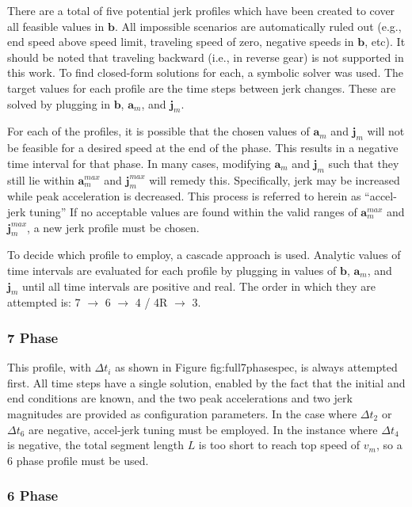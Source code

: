 \documentclass[letterpaper, 10 pt, conference]{ieeeconf}  %
\begin{document}
There are a total of five potential jerk profiles which have been created to cover all feasible values in $\mathbf{b}$.
All impossible scenarios are automatically ruled out (e.g., end speed above speed limit, traveling speed of zero, negative speeds in $\mathbf{b}$, etc).
It should be noted that traveling backward (i.e., in reverse gear) is not supported in this work.
To find closed-form solutions for each, a symbolic solver was used.
The target values for each profile are the time steps between jerk changes.
These are solved by plugging in $\mathbf{b}$, $\mathbf{a}_m$, and $\mathbf{j}_m$.

For each of the profiles, it is possible that the chosen values of $\mathbf{a}_m$ and $\mathbf{j}_m$ will not be feasible for a desired speed at the end of the phase.
This results in a negative time interval for that phase.
In many cases, modifying $\mathbf{a}_m$ and $\mathbf{j}_m$ such that they still lie within $\mathbf{a}^{max}_m$ and $\mathbf{j}^{max}_m$ will remedy this.
Specifically, jerk may be increased while peak acceleration is decreased.
This process is referred to herein as ``accel-jerk tuning''
If no acceptable values are found within the valid ranges of $\mathbf{a}^{max}_m$ and $\mathbf{j}^{max}_m$, a new jerk profile must be chosen.

To decide which profile to employ, a cascade approach is used.
Analytic values of time intervals are evaluated for each profile by plugging in values of $\mathbf{b}$, $\mathbf{a}_m$, and $\mathbf{j}_m$ until all time intervals are positive and real.
The order in which they are attempted is: 7 $\rightarrow$ 6 $\rightarrow$ 4 / 4R $\rightarrow$ 3.

\subsubsection{7 Phase} \label{sec:7phase}

This profile, with $\Delta t_i$ as shown in Figure {fig:full7phasespec}, is always attempted first.
All time steps have a single solution, enabled by the fact that the initial and end conditions are known, and the two peak accelerations and two jerk magnitudes are provided as configuration parameters.
In the case where $\Delta t_2$ or $\Delta t_6$ are negative, accel-jerk tuning must be employed.
In the instance where $\Delta t_4$ is negative, the total segment length $L$ is too short to reach top speed of $v_m$, so a 6 phase profile must be used.

\subsubsection{6 Phase} \label{sec:6phase}
\end{document}
